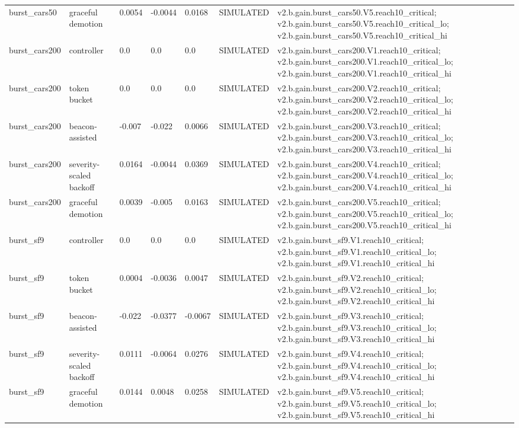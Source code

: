\begin{table}[t]
\begin{tabular}{lllllll}
burst\_cars50 & graceful demotion & 0.0054 & -0.0044 & 0.0168 & SIMULATED & v2.b.gain.burst\_cars50.V5.reach10\_critical; v2.b.gain.burst\_cars50.V5.reach10\_critical\_lo; v2.b.gain.burst\_cars50.V5.reach10\_critical\_hi \\
burst\_cars200 & controller & 0.0 & 0.0 & 0.0 & SIMULATED & v2.b.gain.burst\_cars200.V1.reach10\_critical; v2.b.gain.burst\_cars200.V1.reach10\_critical\_lo; v2.b.gain.burst\_cars200.V1.reach10\_critical\_hi \\
burst\_cars200 & token bucket & 0.0 & 0.0 & 0.0 & SIMULATED & v2.b.gain.burst\_cars200.V2.reach10\_critical; v2.b.gain.burst\_cars200.V2.reach10\_critical\_lo; v2.b.gain.burst\_cars200.V2.reach10\_critical\_hi \\
burst\_cars200 & beacon-assisted & -0.007 & -0.022 & 0.0066 & SIMULATED & v2.b.gain.burst\_cars200.V3.reach10\_critical; v2.b.gain.burst\_cars200.V3.reach10\_critical\_lo; v2.b.gain.burst\_cars200.V3.reach10\_critical\_hi \\
burst\_cars200 & severity-scaled backoff & 0.0164 & -0.0044 & 0.0369 & SIMULATED & v2.b.gain.burst\_cars200.V4.reach10\_critical; v2.b.gain.burst\_cars200.V4.reach10\_critical\_lo; v2.b.gain.burst\_cars200.V4.reach10\_critical\_hi \\
burst\_cars200 & graceful demotion & 0.0039 & -0.005 & 0.0163 & SIMULATED & v2.b.gain.burst\_cars200.V5.reach10\_critical; v2.b.gain.burst\_cars200.V5.reach10\_critical\_lo; v2.b.gain.burst\_cars200.V5.reach10\_critical\_hi \\
burst\_sf9 & controller & 0.0 & 0.0 & 0.0 & SIMULATED & v2.b.gain.burst\_sf9.V1.reach10\_critical; v2.b.gain.burst\_sf9.V1.reach10\_critical\_lo; v2.b.gain.burst\_sf9.V1.reach10\_critical\_hi \\
burst\_sf9 & token bucket & 0.0004 & -0.0036 & 0.0047 & SIMULATED & v2.b.gain.burst\_sf9.V2.reach10\_critical; v2.b.gain.burst\_sf9.V2.reach10\_critical\_lo; v2.b.gain.burst\_sf9.V2.reach10\_critical\_hi \\
burst\_sf9 & beacon-assisted & -0.022 & -0.0377 & -0.0067 & SIMULATED & v2.b.gain.burst\_sf9.V3.reach10\_critical; v2.b.gain.burst\_sf9.V3.reach10\_critical\_lo; v2.b.gain.burst\_sf9.V3.reach10\_critical\_hi \\
burst\_sf9 & severity-scaled backoff & 0.0111 & -0.0064 & 0.0276 & SIMULATED & v2.b.gain.burst\_sf9.V4.reach10\_critical; v2.b.gain.burst\_sf9.V4.reach10\_critical\_lo; v2.b.gain.burst\_sf9.V4.reach10\_critical\_hi \\
burst\_sf9 & graceful demotion & 0.0144 & 0.0048 & 0.0258 & SIMULATED & v2.b.gain.burst\_sf9.V5.reach10\_critical; v2.b.gain.burst\_sf9.V5.reach10\_critical\_lo; v2.b.gain.burst\_sf9.V5.reach10\_critical\_hi \\

\end{tabular}
\end{table}
